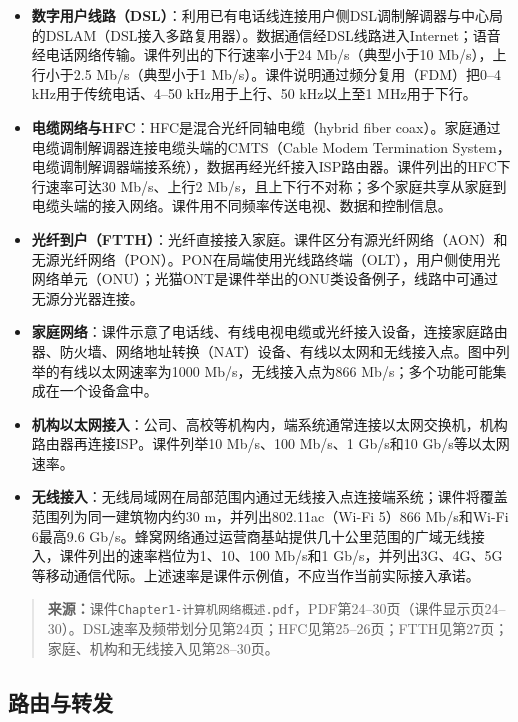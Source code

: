 \begin{itemize}
  \item \textbf{数字用户线路（DSL）}：利用已有电话线连接用户侧DSL调制解调器与中心局的DSLAM（DSL接入多路复用器）。数据通信经DSL线路进入Internet；语音经电话网络传输。课件列出的下行速率小于24 Mb/s（典型小于10 Mb/s），上行小于2.5 Mb/s（典型小于1 Mb/s）。课件说明通过频分复用（FDM）把0--4 kHz用于传统电话、4--50 kHz用于上行、50 kHz以上至1 MHz用于下行。
  \item \textbf{电缆网络与HFC}：HFC是混合光纤同轴电缆（hybrid fiber coax）。家庭通过电缆调制解调器连接电缆头端的CMTS（Cable Modem Termination System，电缆调制解调器端接系统），数据再经光纤接入ISP路由器。课件列出的HFC下行速率可达30 Mb/s、上行2 Mb/s，且上下行不对称；多个家庭共享从家庭到电缆头端的接入网络。课件用不同频率传送电视、数据和控制信息。
  \item \textbf{光纤到户（FTTH）}：光纤直接接入家庭。课件区分有源光纤网络（AON）和无源光纤网络（PON）。PON在局端使用光线路终端（OLT），用户侧使用光网络单元（ONU）；光猫ONT是课件举出的ONU类设备例子，线路中可通过无源分光器连接。
  \item \textbf{家庭网络}：课件示意了电话线、有线电视电缆或光纤接入设备，连接家庭路由器、防火墙、网络地址转换（NAT）设备、有线以太网和无线接入点。图中列举的有线以太网速率为1000 Mb/s，无线接入点为866 Mb/s；多个功能可能集成在一个设备盒中。
  \item \textbf{机构以太网接入}：公司、高校等机构内，端系统通常连接以太网交换机，机构路由器再连接ISP。课件列举10 Mb/s、100 Mb/s、1 Gb/s和10 Gb/s等以太网速率。
  \item \textbf{无线接入}：无线局域网在局部范围内通过无线接入点连接端系统；课件将覆盖范围列为同一建筑物内约30 m，并列出802.11ac（Wi-Fi 5）866 Mb/s和Wi-Fi 6最高9.6 Gb/s。蜂窝网络通过运营商基站提供几十公里范围的广域无线接入，课件列出的速率档位为1、10、100 Mb/s和1 Gb/s，并列出3G、4G、5G等移动通信代际。上述速率是课件示例值，不应当作当前实际接入承诺。
\end{itemize}

\begin{quote}\small\textbf{来源：}课件\texttt{Chapter1-计算机网络概述.pdf}，PDF第24--30页（课件显示页24--30）。DSL速率及频带划分见第24页；HFC见第25--26页；FTTH见第27页；家庭、机构和无线接入见第28--30页。\end{quote}
\annotationarea[4]

\subsection{路由与转发}

